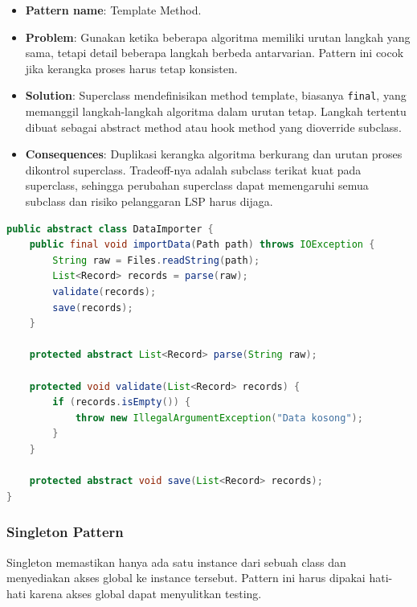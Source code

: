 \begin{itemize}
    \item \textbf{Pattern name}: Template Method.
    \item \textbf{Problem}: Gunakan ketika beberapa algoritma memiliki urutan langkah yang sama, tetapi detail beberapa langkah berbeda antarvarian. Pattern ini cocok jika kerangka proses harus tetap konsisten.
    \item \textbf{Solution}: Superclass mendefinisikan method template, biasanya \texttt{final}, yang memanggil langkah-langkah algoritma dalam urutan tetap. Langkah tertentu dibuat sebagai abstract method atau hook method yang dioverride subclass.
    \item \textbf{Consequences}: Duplikasi kerangka algoritma berkurang dan urutan proses dikontrol superclass. Tradeoff-nya adalah subclass terikat kuat pada superclass, sehingga perubahan superclass dapat memengaruhi semua subclass dan risiko pelanggaran LSP harus dijaga.
\end{itemize}

\begin{lstlisting}[language=Java, caption={Template Method Pattern}, label={lst:template-method}]
public abstract class DataImporter {
    public final void importData(Path path) throws IOException {
        String raw = Files.readString(path);
        List<Record> records = parse(raw);
        validate(records);
        save(records);
    }

    protected abstract List<Record> parse(String raw);

    protected void validate(List<Record> records) {
        if (records.isEmpty()) {
            throw new IllegalArgumentException("Data kosong");
        }
    }

    protected abstract void save(List<Record> records);
}
\end{lstlisting}

\subsubsection{Singleton Pattern}

\begin{jawab}
Singleton memastikan hanya ada satu instance dari sebuah class dan menyediakan akses global ke instance tersebut. Pattern ini harus dipakai hati-hati karena akses global dapat menyulitkan testing.
\end{jawab}

